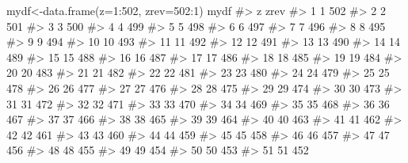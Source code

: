 \documentclass[
  letterpaper,
  DIV=11,
  numbers=noendperiod]{scrreprt}
\newenvironment{Shaded}{\begin{snugshade}}{\end{snugshade}}
\newcommand{\AttributeTok}[1]{\textcolor[rgb]{0.40,0.45,0.13}{#1}}
\newcommand{\CommentTok}[1]{\textcolor[rgb]{0.37,0.37,0.37}{#1}}
\newcommand{\DecValTok}[1]{\textcolor[rgb]{0.68,0.00,0.00}{#1}}
\newcommand{\FunctionTok}[1]{\textcolor[rgb]{0.28,0.35,0.67}{#1}}
\newcommand{\NormalTok}[1]{\textcolor[rgb]{0.00,0.23,0.31}{#1}}
\newcommand{\OtherTok}[1]{\textcolor[rgb]{0.00,0.23,0.31}{#1}}
\newcommand{\SpecialCharTok}[1]{\textcolor[rgb]{0.37,0.37,0.37}{#1}}
\begin{document}
\begin{Shaded}
\begin{Highlighting}[]
\NormalTok{mydf}\OtherTok{\textless{}{-}}\FunctionTok{data.frame}\NormalTok{(}\AttributeTok{z=}\DecValTok{1}\SpecialCharTok{:}\DecValTok{502}\NormalTok{, }\AttributeTok{zrev=}\DecValTok{502}\SpecialCharTok{:}\DecValTok{1}\NormalTok{)}
\NormalTok{mydf}
\CommentTok{\#\textgreater{}       z zrev}
\CommentTok{\#\textgreater{} 1     1  502}
\CommentTok{\#\textgreater{} 2     2  501}
\CommentTok{\#\textgreater{} 3     3  500}
\CommentTok{\#\textgreater{} 4     4  499}
\CommentTok{\#\textgreater{} 5     5  498}
\CommentTok{\#\textgreater{} 6     6  497}
\CommentTok{\#\textgreater{} 7     7  496}
\CommentTok{\#\textgreater{} 8     8  495}
\CommentTok{\#\textgreater{} 9     9  494}
\CommentTok{\#\textgreater{} 10   10  493}
\CommentTok{\#\textgreater{} 11   11  492}
\CommentTok{\#\textgreater{} 12   12  491}
\CommentTok{\#\textgreater{} 13   13  490}
\CommentTok{\#\textgreater{} 14   14  489}
\CommentTok{\#\textgreater{} 15   15  488}
\CommentTok{\#\textgreater{} 16   16  487}
\CommentTok{\#\textgreater{} 17   17  486}
\CommentTok{\#\textgreater{} 18   18  485}
\CommentTok{\#\textgreater{} 19   19  484}
\CommentTok{\#\textgreater{} 20   20  483}
\CommentTok{\#\textgreater{} 21   21  482}
\CommentTok{\#\textgreater{} 22   22  481}
\CommentTok{\#\textgreater{} 23   23  480}
\CommentTok{\#\textgreater{} 24   24  479}
\CommentTok{\#\textgreater{} 25   25  478}
\CommentTok{\#\textgreater{} 26   26  477}
\CommentTok{\#\textgreater{} 27   27  476}
\CommentTok{\#\textgreater{} 28   28  475}
\CommentTok{\#\textgreater{} 29   29  474}
\CommentTok{\#\textgreater{} 30   30  473}
\CommentTok{\#\textgreater{} 31   31  472}
\CommentTok{\#\textgreater{} 32   32  471}
\CommentTok{\#\textgreater{} 33   33  470}
\CommentTok{\#\textgreater{} 34   34  469}
\CommentTok{\#\textgreater{} 35   35  468}
\CommentTok{\#\textgreater{} 36   36  467}
\CommentTok{\#\textgreater{} 37   37  466}
\CommentTok{\#\textgreater{} 38   38  465}
\CommentTok{\#\textgreater{} 39   39  464}
\CommentTok{\#\textgreater{} 40   40  463}
\CommentTok{\#\textgreater{} 41   41  462}
\CommentTok{\#\textgreater{} 42   42  461}
\CommentTok{\#\textgreater{} 43   43  460}
\CommentTok{\#\textgreater{} 44   44  459}
\CommentTok{\#\textgreater{} 45   45  458}
\CommentTok{\#\textgreater{} 46   46  457}
\CommentTok{\#\textgreater{} 47   47  456}
\CommentTok{\#\textgreater{} 48   48  455}
\CommentTok{\#\textgreater{} 49   49  454}
\CommentTok{\#\textgreater{} 50   50  453}
\CommentTok{\#\textgreater{} 51   51  452}

\end{Highlighting}
\end{Shaded}
\end{document}
